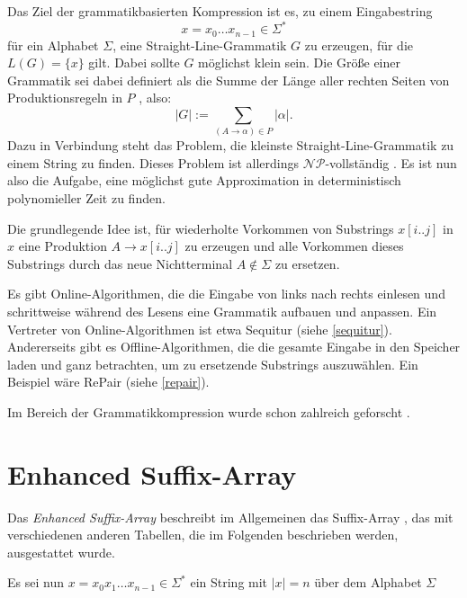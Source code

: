 Das Ziel der grammatikbasierten Kompression ist es, zu einem Eingabestring 
\begin{equation*}
	x = x_0 \dots x_{n-1} \in \Sigma^*
\end{equation*}
für ein Alphabet $\Sigma$, eine Straight-Line-Grammatik $G$ zu erzeugen, für die $L(G) = \{x\}$ gilt. Dabei sollte $G$ möglichst klein sein. Die Größe einer Grammatik sei dabei definiert als die Summe der Länge aller rechten Seiten von Produktionsregeln in $P$ \cite{charikar_smallest_2005}, also:
\begin{equation*}
	|G| := \sum_{(A \rightarrow \alpha) \in P} |\alpha|.
\end{equation*}
Dazu in Verbindung steht das Problem, die kleinste Straight-Line-Grammatik zu einem String zu finden. 
Dieses Problem ist allerdings $\mathcal{NP}$-vollständig \cite{charikar_smallest_2005}. Es ist nun also die Aufgabe, eine möglichst gute Approximation in deterministisch polynomieller Zeit zu finden.

Die grundlegende Idee ist, für wiederholte Vorkommen von Substrings $x[i..j]$ in $x$ eine Produktion $A \rightarrow x[i..j]$ zu erzeugen und alle Vorkommen dieses Substrings durch das neue Nichtterminal $A \notin \Sigma$ zu ersetzen.

Es gibt Online-Algorithmen, die die Eingabe von links nach rechts einlesen und schrittweise während des Lesens eine Grammatik aufbauen und anpassen. Ein Vertreter von Online-Algorithmen ist etwa Sequitur \cite{nevill-manning_identifying_1997} (siehe \autoref{sequitur}). 
Andererseits gibt es Offline-Algorithmen, die die gesamte Eingabe in den Speicher laden und ganz betrachten, um zu ersetzende Substrings auszuwählen. Ein Beispiel wäre RePair \cite{larsson_offline_1999} (siehe \autoref{repair}).

Im Bereich der Grammatikkompression wurde schon zahlreich geforscht \cite{benz_effective_2013, carrascosa_choosing_2010, charikar_smallest_2005}. 

\section{Enhanced Suffix-Array}

Das \emph{Enhanced Suffix-Array} \cite{abouelhoda_replacing_2004} beschreibt im Allgemeinen das Suffix-Array \cite{manber_suffix_1993}, das mit verschiedenen anderen Tabellen, die im Folgenden beschrieben werden, ausgestattet wurde.

Es sei nun $x = x_0 x_1 \dots x_{n-1}\in \Sigma^*$ ein String mit $|x| = n$ über dem Alphabet $\Sigma$ 

